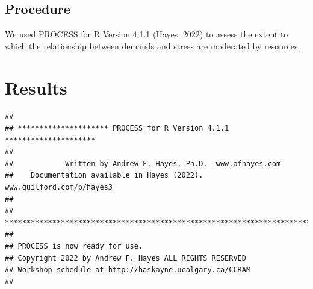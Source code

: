 \documentclass[
  man]{apa6}
\begin{document}
\hypertarget{procedure}{%
\subsection{Procedure}\label{procedure}}

We used PROCESS for R Version 4.1.1 (Hayes, 2022) to assess the extent to which the relationship between demands and stress are moderated by resources.

\hypertarget{results}{%
\section{Results}\label{results}}

\begin{verbatim}
## 
## ********************* PROCESS for R Version 4.1.1 ********************* 
##  
##            Written by Andrew F. Hayes, Ph.D.  www.afhayes.com              
##    Documentation available in Hayes (2022). www.guilford.com/p/hayes3   
##  
## *********************************************************************** 
##  
## PROCESS is now ready for use.
## Copyright 2022 by Andrew F. Hayes ALL RIGHTS RESERVED
## Workshop schedule at http://haskayne.ucalgary.ca/CCRAM
## 
\end{verbatim}
\end{document}

